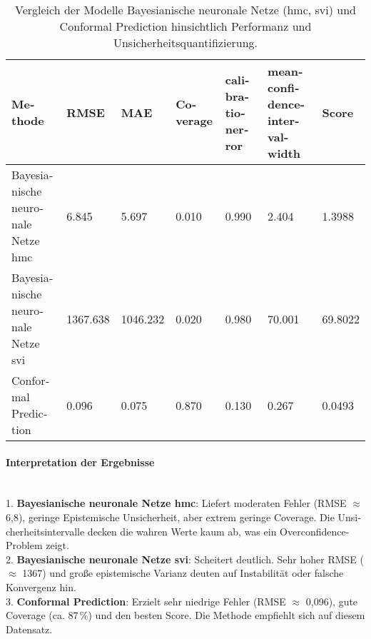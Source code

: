 \begin{otherlanguage}{ngerman}
\begin{table}[!htbp]
  \centering
  \footnotesize
  \begin{tabularx}{\textwidth}{|>{\arraybackslash}X|X|X|X|X|X|X|}
  \hline
  \textbf{Methode} & \textbf{RMSE} & \textbf{MAE} & \textbf{Coverage} & \textbf{\gls{calibrationerror}} & \textbf{\gls{meanconfidenceintervalwidth}} & \textbf{Score} \\
  \hline
  \gls{Bayesianische neuronale Netze} \gls{hmc} & 6.845 & 5.697 & 0.010 & 0.990 & 2.404 & 1.3988 \\
  \hline
  \gls{Bayesianische neuronale Netze} \gls{svi} & 1367.638 & 1046.232 & 0.020 & 0.980 & 70.001 & 69.8022 \\
  \hline
  \gls{Conformal Prediction} & 0.096 & 0.075 & 0.870 & 0.130 & 0.267 & 0.0493 \\
  \hline
  \end{tabularx}
  \caption{Vergleich der Modelle \gls{Bayesianische neuronale Netze} (\gls{hmc}, \gls{svi}) und \gls{Conformal Prediction} hinsichtlich Performanz und Unsicherheitsquantifizierung.}
  \label{tab:r8_results}
\end{table}



\paragraph{Interpretation der Ergebnisse}\par\noindent\\

1. \textbf{\gls{Bayesianische neuronale Netze} \gls{hmc}}: Liefert moderaten Fehler (RMSE $\approx$ 6{,}8), geringe \gls{Epistemische Unsicherheit}, aber extrem geringe Coverage. Die Unsicherheitsintervalle decken die wahren Werte kaum ab, was ein Overconfidence-Problem zeigt.\\
2. \textbf{\gls{Bayesianische neuronale Netze} \gls{svi}}: Scheitert deutlich. Sehr hoher RMSE ($\approx$ 1367) und große epistemische Varianz deuten auf Instabilität oder falsche Konvergenz hin.\\
3. \textbf{\gls{Conformal Prediction}}: Erzielt sehr niedrige Fehler (RMSE $\approx$ 0{,}096), gute Coverage (ca. 87\,\%) und den besten Score. Die Methode empfiehlt sich auf diesem Datensatz.



\pagebreak



\end{otherlanguage}

